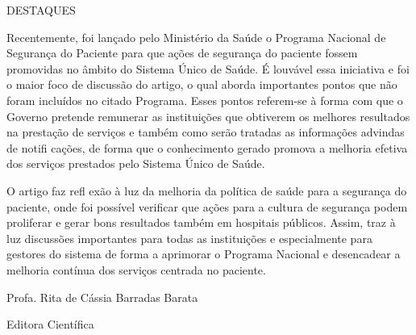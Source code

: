 \documentclass{article}
\begin{document}
DESTAQUES

Recentemente, foi lançado pelo Ministério da Saúde o Programa Nacional de
Segurança do
Paciente para que ações de segurança do paciente fossem promovidas no âmbito do
Sistema
Único de Saúde. É louvável essa iniciativa e foi o maior foco de discussão do
artigo, o qual
aborda importantes pontos que não foram incluídos no citado Programa. Esses
pontos
referem-se à forma com que o Governo pretende remunerar as instituições que
obtiverem os
melhores resultados na prestação de serviços e também como serão tratadas as
informações
advindas de notifi cações, de forma que o conhecimento gerado promova a melhoria
efetiva dos
serviços prestados pelo Sistema Único de Saúde.

O artigo faz refl exão à luz da melhoria da política de saúde para a segurança
do paciente,
onde foi possível verificar que ações para a cultura de segurança podem
proliferar e gerar
bons resultados também em hospitais públicos. Assim, traz à luz discussões
importantes para
todas as instituições e especialmente para gestores do sistema de forma a
aprimorar o
Programa Nacional e desencadear a melhoria contínua dos serviços centrada no
paciente.

Profa. Rita de Cássia Barradas Barata

Editora Científica
\end{document}
